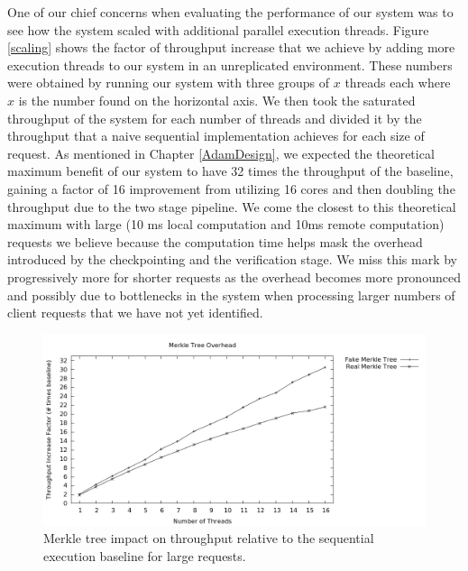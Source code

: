 \documentclass[11pt, oneside]{report}
\begin{document}
One of our chief concerns when evaluating the performance of our system was to see how the system scaled with additional parallel execution threads. Figure \ref{scaling} shows the factor of throughput increase that we achieve by adding more execution threads to our system in an unreplicated environment. 
These numbers were obtained by running our system with three groups of $x$ threads each where $x$ is the number found on the horizontal axis. 
We then took the saturated throughput of the system for each number of threads and divided it by the throughput that a naive sequential implementation achieves for each size of request.
As mentioned in Chapter \ref{AdamDesign}, we expected the theoretical maximum benefit of our system to have 32 times the throughput of the baseline, gaining a factor of 16 improvement from utilizing 16 cores and then doubling the throughput due to the two stage pipeline.
We come the closest to this theoretical maximum with large (10 ms local computation and 10ms remote computation) requests  we believe because the computation time helps mask the overhead introduced by the checkpointing and the verification stage.
We miss this mark by progressively more for shorter requests as the overhead becomes more pronounced and possibly due to bottlenecks in the system when processing larger numbers of client requests that we have not yet identified.

\begin{figure}[h]
\centering
\includegraphics[width=1.0\textwidth]{graphs/merkleimpact/graph.png}
\caption{\label{scalingmedmerkletree}Merkle tree impact on throughput relative to the sequential execution baseline for large requests.}
\end{figure}
\end{document}
